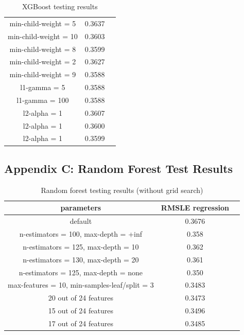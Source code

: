 \documentclass[a4paper]{article}
\begin{document}
\begin{table}[h!]
\begin{tabular}{ccc}
        min-child-weight = 5 & 0.3637 \\
        min-child-weight = 10 & 0.3603 \\
        min-child-weight = 8 & 0.3599 \\
        min-child-weight = 2 & 0.3627 \\
        min-child-weight = 9 & 0.3588 \\
        l1-gamma = 5 & 0.3588 \\
        l1-gamma = 100 & 0.3588 \\
        l2-alpha = 1 & 0.3607 \\
        l2-alpha = 1 & 0.3600 \\
        l2-alpha = 1 & 0.3599 \\
        \hline
    \end{tabular}
    \caption{XGBoost testing results}
    \label{results}
\end{table}

\subsection{Appendix C: Random Forest Test Results}
\begin{table}[h!]
    \centering
    \begin{tabular}{ccc}
        parameters & RMSLE regression\\
        \hline
        default & 0.3676 \\
        n-estimators = 100, max-depth = +inf & 0.358 \\
        n-estimators = 125, max-depth = 10 & 0.362 \\
        n-estimators = 130, max-depth = 20 & 0.361 \\
        n-estimators = 125, max-depth = none & 0.350 \\
        max-features = 10, min-samples-leaf/split = 3 & 0.3483 \\
        20 out of 24 features & 0.3473 \\
        15 out of 24 features & 0.3496 \\
        17 out of 24 features & 0.3485 \\
        \hline
    \end{tabular}
    \caption{Random forest testing results (without grid search)}
    \label{results}
\end{table}
\end{document}

